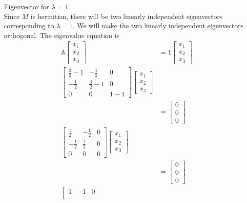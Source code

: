 \begin{enumerate}
	\underline{Eigenvector for $\lambda=1$}\\
	Since $M$ is hermitian, there will be two linearly independent eigenvectors corresponding to $\lambda=1$. We will make the two linearly independent eigenvectors orthogonal. The eigenvalue equation is
	\begin{align*}
		\mathbb{A} \left[\begin{matrix}
		x_1 \\ x_2 \\ x_3
		\end{matrix}\right]
		&= 1 \left[\begin{matrix}
		x_1 \\ x_2 \\ x_3
		\end{matrix}\right] \\
		\left[\begin{matrix}
		\frac{3}{2}-1 & -\frac{1}{2} & 0 \\
		-\frac{1}{2} &\frac{3}{2}-1 & 0 \\
		0 & 0 & 1-1
		\end{matrix}\right]
		\left[\begin{matrix}
		x_1 \\ x_2 \\ x_3
		\end{matrix}\right] \\
		&=
		\left[\begin{matrix}
		0 \\ 0 \\ 0
		\end{matrix}\right] \\
		\left[\begin{matrix}
		\frac{1}{2} & -\frac{1}{2} & 0 \\
		-\frac{1}{2} &\frac{1}{2} & 0 \\
		0 & 0 & 0
		\end{matrix}\right]
		\left[\begin{matrix}
		x_1 \\ x_2 \\ x_3
		\end{matrix}\right] \\
		&=
		\left[\begin{matrix}
		0 \\ 0 \\ 0
		\end{matrix}\right]\\
		\left[\begin{matrix}
		1 & -1 & 0 \\

\end{matrix}
\end{align*}
\end{enumerate}
